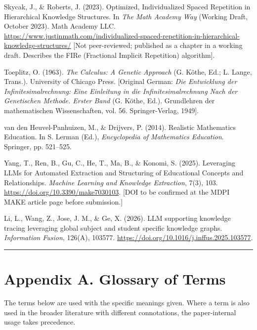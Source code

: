\documentclass[
]{article}
\begin{document}
Skycak, J., \& Roberts, J. (2023). Optimized, Individualized Spaced Repetition in Hierarchical Knowledge Structures. In \emph{The Math Academy Way} (Working Draft, October 2023). Math Academy LLC. \url{https://www.justinmath.com/individualized-spaced-repetition-in-hierarchical-knowledge-structures/} {[}Not peer-reviewed; published as a chapter in a working draft. Describes the FIRe (Fractional Implicit Repetition) algorithm{]}.

Toeplitz, O. (1963). \emph{The Calculus: A Genetic Approach} (G. Köthe, Ed.; L. Lange, Trans.). University of Chicago Press. {[}Original German: \emph{Die Entwicklung der Infinitesimalrechnung: Eine Einleitung in die Infinitesimalrechnung Nach der Genetischen Methode. Erster Band} (G. Köthe, Ed.). Grundlehren der mathematischen Wissenschaften, vol. 56. Springer-Verlag, 1949{]}.

van den Heuvel-Panhuizen, M., \& Drijvers, P. (2014). Realistic Mathematics Education. In S. Lerman (Ed.), \emph{Encyclopedia of Mathematics Education}. Springer, pp. 521--525.

Yang, T., Ren, B., Gu, C., He, T., Ma, B., \& Konomi, S. (2025). Leveraging LLMs for Automated Extraction and Structuring of Educational Concepts and Relationships. \emph{Machine Learning and Knowledge Extraction}, 7(3), 103. \url{https://doi.org/10.3390/make7030103}. {[}DOI to be confirmed at the MDPI MAKE article page before submission.{]}

Li, L., Wang, Z., Jose, J. M., \& Ge, X. (2026). LLM supporting knowledge tracing leveraging global subject and student specific knowledge graphs. \emph{Information Fusion}, 126(A), 103577. \url{https://doi.org/10.1016/j.inffus.2025.103577}.

\begin{center}\rule{0.5\linewidth}{0.5pt}\end{center}

\section{Appendix A. Glossary of Terms}\label{appendix-a-glossary-of-terms}

The terms below are used with the specific meanings given. Where a term is also used in the broader literature with different connotations, the paper-internal usage takes precedence.
\end{document}
